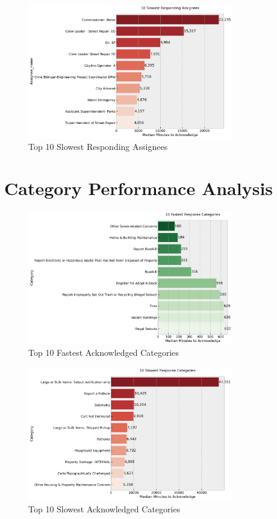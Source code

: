 \documentclass[12pt]{report}
\begin{document}
\begin{figure}[H]
\centering
\includegraphics[width=0.8\textwidth]{slowest_assignees}
\caption{Top 10 Slowest Responding Assignees}
\label{fig:slow_assignees}
\end{figure}

\section{Category Performance Analysis}

\begin{figure}[H]
\centering
\includegraphics[width=0.8\textwidth]{fastest_categories}
\caption{Top 10 Fastest Acknowledged Categories}
\label{fig:fast_categories}
\end{figure}

\begin{figure}[H]
\centering
\includegraphics[width=0.8\textwidth]{slowest_categories}
\caption{Top 10 Slowest Acknowledged Categories}
\label{fig:slow_categories}
\end{figure}
\end{document}
